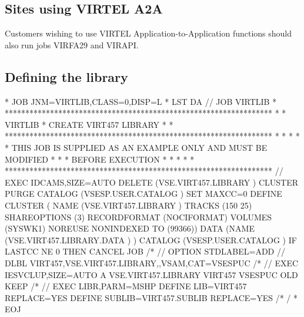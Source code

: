 \documentclass[letterpaper,10pt,english]{sphinxmanual}
\begin{document}
\subsection{Sites using VIRTEL A2A}
\label{\detokenize{Installation_Guide:sites-using-virtel-a2a}}
Customers wishing to use VIRTEL Application-to-Application functions should also run jobs VIRFA29 and VIRAPI.


\subsection{Defining the library}
\label{\detokenize{Installation_Guide:defining-the-library}}
\begin{sphinxVerbatim}[commandchars=\\\{\}]
* \PYGZdl{}\PYGZdl{} JOB JNM=VIRTLIB,CLASS=0,DISP=L
* \PYGZdl{}\PYGZdl{} LST DA
// JOB VIRTLIB
* *****************************************************************
* * VIRTLIB * CREATE VIRT457 LIBRARY                              *
* *****************************************************************
* *                                                               *
* * THIS JOB IS SUPPLIED AS AN EXAMPLE ONLY AND MUST BE MODIFIED  *
* * BEFORE EXECUTION                                              *
* *                                                               *
* *****************************************************************
// EXEC IDCAMS,SIZE=AUTO
 DELETE (VSE.VIRT457.LIBRARY ) \PYGZhy{}
          CLUSTER \PYGZhy{}
          PURGE \PYGZhy{}
    CATALOG (VSESP.USER.CATALOG )
 SET MAXCC=0
 DEFINE CLUSTER ( \PYGZhy{}
            NAME (VSE.VIRT457.LIBRARY ) \PYGZhy{}
            TRACKS (150 25) \PYGZhy{}
            SHAREOPTIONS (3) \PYGZhy{}
            RECORDFORMAT (NOCIFORMAT) \PYGZhy{}
            VOLUMES (SYSWK1) \PYGZhy{}
            NOREUSE \PYGZhy{}
            NONINDEXED \PYGZhy{}
            TO (99366)) \PYGZhy{}
            DATA (NAME (VSE.VIRT457.LIBRARY.DATA ) ) \PYGZhy{}
            CATALOG (VSESP.USER.CATALOG )
 IF LASTCC NE 0 THEN CANCEL JOB
/*
// OPTION STDLABEL=ADD
// DLBL VIRT457,\PYGZsq{}VSE.VIRT457.LIBRARY\PYGZsq{},,VSAM,CAT=VSESPUC
/*
// EXEC IESVCLUP,SIZE=AUTO
A VSE.VIRT457.LIBRARY        VIRT457 VSESPUC OLD KEEP
/*
// EXEC LIBR,PARM=\PYGZsq{}MSHP\PYGZsq{}
              DEFINE LIB=VIRT457 REPLACE=YES
              DEFINE SUBLIB=VIRT457.SUBLIB REPLACE=YES
/*
/\PYGZam{}
* \PYGZdl{}\PYGZdl{} EOJ
\end{sphinxVerbatim}

\end{document}
